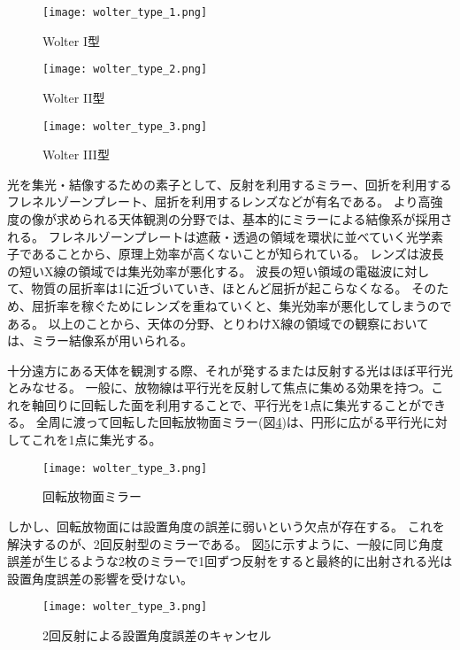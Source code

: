\begin{figure}[b]
\centering
\texttt{[image: wolter\_type\_1.png]}
\caption{Wolter I型}
\label{fig:wolter_type_1}
\end{figure}

\begin{figure}[b]
\centering
\texttt{[image: wolter\_type\_2.png]}
\caption{Wolter II型}
\label{fig:wolter_type_2}
\end{figure}

\begin{figure}[b]
\centering
\texttt{[image: wolter\_type\_3.png]}
\caption{Wolter III型}
\label{fig:wolter_type_3}
\end{figure}

光を集光・結像するための素子として、反射を利用するミラー、回折を利用するフレネルゾーンプレート、屈折を利用するレンズなどが有名である。
より高強度の像が求められる天体観測の分野では、基本的にミラーによる結像系が採用される。
フレネルゾーンプレートは遮蔽・透過の領域を環状に並べていく光学素子であることから、原理上効率が高くないことが知られている。
レンズは波長の短いX線の領域では集光効率が悪化する。
波長の短い領域の電磁波に対して、物質の屈折率は1に近づいていき、ほとんど屈折が起こらなくなる。
そのため、屈折率を稼ぐためにレンズを重ねていくと、集光効率が悪化してしまうのである。
以上のことから、天体の分野、とりわけX線の領域での観察においては、ミラー結像系が用いられる。

十分遠方にある天体を観測する際、それが発するまたは反射する光はほぼ平行光とみなせる。
一般に、放物線は平行光を反射して焦点に集める効果を持つ。これを軸回りに回転した面を利用することで、平行光を1点に集光することができる。
全周に渡って回転した回転放物面ミラー(図\ref{fig:parabola_rotation_mirror})は、円形に広がる平行光に対してこれを1点に集光する。

\begin{figure}[b]
\centering
\texttt{[image: wolter\_type\_3.png]}
\caption{回転放物面ミラー}
\label{fig:parabola_rotation_mirror}
\end{figure}

しかし、回転放物面には設置角度の誤差に弱いという欠点が存在する。
これを解決するのが、2回反射型のミラーである。
図\ref{fig:canceling_angle_error_by_two_reflections}に示すように、一般に同じ角度誤差が生じるような2枚のミラーで1回ずつ反射をすると最終的に出射される光は設置角度誤差の影響を受けない。

\begin{figure}[b]
\centering
\texttt{[image: wolter\_type\_3.png]}
\caption{2回反射による設置角度誤差のキャンセル}
\label{fig:canceling_angle_error_by_two_reflections}
\end{figure}

